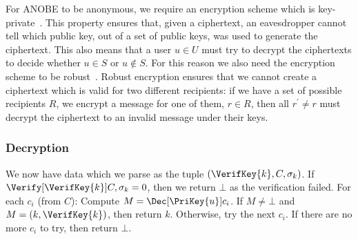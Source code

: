 For \ac{ANOBE} to be anonymous, we require an encryption scheme which is 
key-private~\cite{KeyPrivacy}.
This property ensures that, given a ciphertext, an eavesdropper cannot tell 
which public key, out of a set of public keys, was used to generate the 
ciphertext.
This also means that a user \(u\in U\) must try to decrypt the ciphertexts to 
decide whether \(u\in S\) or \(u\notin S\).
For this reason we also need the encryption scheme to be 
robust~\cite{RobustEncryption}.
Robust encryption ensures that we cannot create a ciphertext which is valid for 
two different recipients:
if we have a set of possible recipients \(R\), we encrypt a message for one of 
them, \(r\in R\), then all \(r^\prime\neq r\) must decrypt the ciphertext to an 
invalid message under their keys.

\subsubsection<article>{Decryption}

We now have data which we parse as the tuple \((\VerifKey{k}, C, \sigma_k)\).
If \(\Verify[\VerifKey{k}]{ C, \sigma_k } = 0\), then we return \(\bot\) as the 
verification failed.
For each \(c_i\) (from \(C\)):
Compute \(M = \Dec[\PriKey{u}]{ c_i }\).
If \(M \neq \bot\) and \(M = (k, \VerifKey{k})\), then return \(k\).
Otherwise, try the next \(c_i\).
If there are no more \(c_i\) to try, then return \(\bot\).

\begin{frame}
  \begin{figure}
    \begin{algorithmic}[1]
        \pause{}

          \State{%
            \Return{$\bot$}
          }
        \EndIf{}

        \pause{}

            \State{\Return{$\bot$}}
          \EndIf{}
        \EndFor{}
        \State{\Return{$\bot$}}
      \EndFunction{}
    \end{algorithmic}
  \end{figure}
\end{frame}

